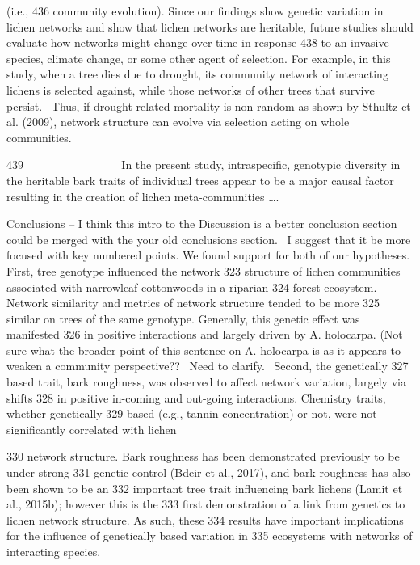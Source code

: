 \documentclass[fleqn,12pt]{olplainarticle}
\begin{document}
(i.e.,
436 community evolution). Since our findings show genetic variation in
lichen networks and show that lichen networks are heritable, future
studies should evaluate how networks might change over time in
response
438 to an invasive species, climate change, or some other agent of
selection. For example, in this study, when a tree dies due to
drought, its community network of interacting lichens is selected
against, while those networks of other trees that survive persist. 
Thus, if drought related mortality is non-random as shown by Sthultz
et al. (2009), network structure can evolve via selection acting on
whole communities.

439                  In the present study, intraspecific, genotypic
diversity in the heritable bark traits of individual trees appear to
be a major causal factor resulting in the creation of lichen
meta-communities ….

Conclusions – I think this intro to the Discussion is a better
conclusion section could be merged with the your old conclusions
section.  I suggest that it be more focused with key numbered points.
We found support for both of our hypotheses. First, tree genotype
influenced the network
323 structure of lichen communities associated with narrowleaf
cottonwoods in a riparian
324 forest ecosystem. Network similarity and metrics of network
structure tended to be more
325 similar on trees of the same genotype. Generally, this genetic
effect was manifested
326 in positive interactions and largely driven by A. holocarpa. (Not
sure what the broader point of this sentence on A. holocarpa is as it
appears to weaken a community perspective??  Need to clarify.  Second,
the genetically
327 based trait, bark roughness, was observed to affect network
variation, largely via shifts
328 in positive in-coming and out-going interactions. Chemistry
traits, whether genetically
329 based (e.g., tannin concentration) or not, were not significantly
correlated with lichen

330 network structure. Bark roughness has been demonstrated previously
to be under strong
331 genetic control (Bdeir et al., 2017), and bark roughness has also
been shown to be an
332 important tree trait influencing bark lichens (Lamit et al.,
2015b); however this is the
333 first demonstration of a link from genetics to lichen network
structure. As such, these
334 results have important implications for the influence of
genetically based variation in
335 ecosystems with networks of interacting species.
\end{document}
